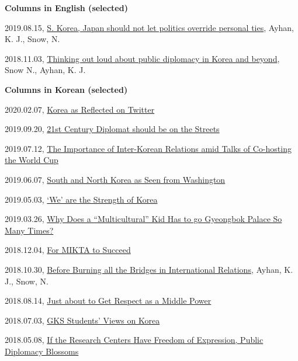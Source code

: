 \documentclass[11pt,a4paper,]{awesome-cv}
\begin{document}
\textbf{Columns in English (selected)}

2019.08.15,
\href{http://www.koreaherald.com/view.php?ud=20190815000192}{S. Korea,
Japan should not let politics override personal ties}, Ayhan, K. J.,
Snow, N.

2018.11.03,
\href{http://www.koreatimes.co.kr/www/opinion/2018/11/734_258046.html}{Thinking
out loud about public diplomacy in Korea and beyond}, Snow N., Ayhan, K.
J.

\textbf{Columns in Korean (selected)}

2020.02.07,
\href{https://www.donga.com/news/List/Series_70040100000265/article/all/20200207/99578393/1}{Korea
as Reflected on Twitter}

2019.09.20,
\href{http://www.donga.com/news/article/all/20190920/97489317/1}{21st
Century Diplomat should be on the Streets}

2019.07.12,
\href{https://www.donga.com/news/List/Series_70040100000265/article/all/20190712/96438479/1}{The
Importance of Inter-Korean Relations amid Talks of Co-hosting the World
Cup}

2019.06.07,
\href{https://www.donga.com/news/List/Series_70040100000265/article/all/20190607/95879632/1}{South
and North Korea as Seen from Washington}

2019.05.03,
\href{http://www.donga.com/news/List/Series_70040100000265/article/all/20190503/95363228/1}{`We'
are the Strength of Korea}

2019.03.26,
\href{http://www.donga.com/news/List/Series_70040100000265/article/all/20190326/94729975/1}{Why
Does a ``Multicultural'' Kid Has to go Gyeongbok Palace So Many Times?}

2018.12.04,
\href{http://www.donga.com/news/List/Series_70040100000265/article/all/20181204/93139052/1}{For
MIKTA to Succeed}

2018.10.30,
\href{http://www.donga.com/news/List/Series_70040100000265/article/all/20181030/92643028/1}{Before
Burning all the Bridges in International Relations}, Ayhan, K. J., Snow,
N.

2018.08.14,
\href{http://www.donga.com/news/List/Series_70040100000265/article/all/20180814/91504198/1}{Just
about to Get Respect as a Middle Power}

2018.07.03,
\href{http://www.donga.com/news/List/Series_70040100000265/article/all/20180703/90869259/1}{GKS
Students' Views on Korea}

2018.05.08,
\href{http://www.donga.com/news/List/Series_70040100000265/article/all/20180508/89969581/1}{If
the Research Centers Have Freedom of Expression, Public Diplomacy
Blossoms}
\end{document}
